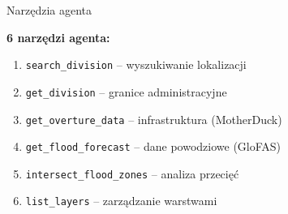 \documentclass[aspectratio=169]{beamer}
\begin{document}
\begin{frame}{Narzędzia agenta}
\begin{center}
\textbf{6 narzędzi agenta:}
\vspace{0.5cm}

\begin{enumerate}
    \item \texttt{search\_division} -- wyszukiwanie lokalizacji
    \vspace{0.3cm}
    \item \texttt{get\_division} -- granice administracyjne
    \vspace{0.3cm}
    \item \texttt{get\_overture\_data} -- infrastruktura (MotherDuck)
    \vspace{0.3cm}
    \item \texttt{get\_flood\_forecast} -- dane powodziowe (GloFAS)
    \vspace{0.3cm}
    \item \texttt{intersect\_flood\_zones} -- analiza przecięć
    \vspace{0.3cm}
    \item \texttt{list\_layers} -- zarządzanie warstwami
\end{enumerate}
\end{center}
\end{frame}
\end{document}
